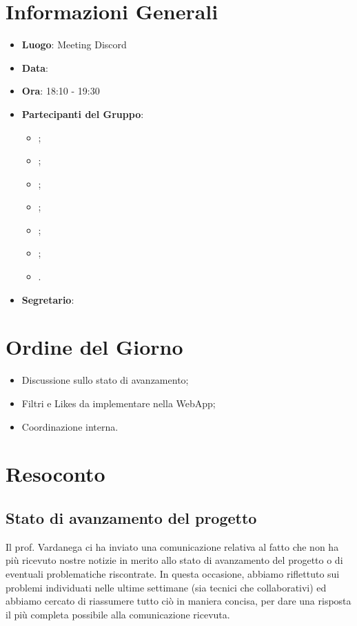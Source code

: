 \section{Informazioni Generali}

\begin{itemize}
	\item{\textbf{Luogo}}: Meeting Discord
	\item{\textbf{Data}}: \D
	\item{\textbf{Ora}}: 18:10 - 19:30
	\item{\textbf{Partecipanti del Gruppo}}:
	\begin{itemize}
		\item{\EP{};}
		\item{\FP{};}
		\item{\GC{};}
		\item{\LW{};}
		\item{\MG{};}
		\item{\MG{};}
		\item{\PV{}.}
	\end{itemize}
	\item{\textbf{Segretario}}: \GC{}
\end{itemize}

\section{Ordine del Giorno}
\begin{itemize}
	\item{Discussione sullo stato di avanzamento;}
	\item{Filtri e Likes da implementare nella WebApp;}
	\item{Coordinazione interna.}
\end{itemize}

\section{Resoconto}

\subsection{Stato di avanzamento del progetto}

Il prof. Vardanega ci ha inviato una comunicazione relativa al fatto che non ha più ricevuto nostre notizie in merito allo stato di avanzamento del progetto o di eventuali problematiche riscontrate. In questa occasione, abbiamo riflettuto sui problemi individuati nelle ultime settimane (sia tecnici che collaborativi) ed abbiamo cercato di riassumere tutto ciò in maniera concisa, per dare una risposta il più completa possibile alla comunicazione ricevuta.

